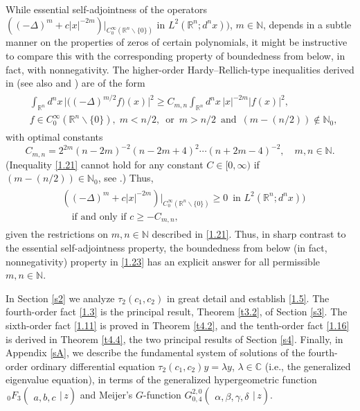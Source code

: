 \documentclass[reqno,11pt,centertags]{amsart}
\newcommand{\bbN}{{\mathbb{N}}}
\newcommand{\bbR}{{\mathbb{R}}}
\newcommand{\bbC}{{\mathbb{C}}}
\newcommand{\<}{\langle}
\renewcommand{\>}{\rangle}
\newcommand{\lb}{\label}
\numberwithin{equation}{section}
\theoremstyle{definition}
\begin{document}
While essential self-adjointness of the operators $\left((-\Delta)^m +c|x|^{-2m}\right)\big|_{C_0^{\infty}(\bbR^n \backslash \{0\})}$ in $L^2(\bbR^n; d^nx))$, $m \in \bbN$, depends in a subtle manner on the properties of zeros of certain polynomials, it might be instructive to compare this with the corresponding property of boundedness from below, in fact, with nonnegativity. The higher-order Hardy--Rellich-type inequalities derived in \cite{Ya99} (see also \cite[p.~39--40]{BEL15} and \cite{He77}) are of the form 
\begin{align}
\begin{split} 
& \int_{\bbR^n} d^n x \, \big|\big((-\Delta)^{m/2} f\big)(x)\big|^2 \geq C_{m,n} \int_{\bbR^n} d^n x \, |x|^{-2m} |f(x)|^2,     \lb{1.21} \\
& f \in C_0^{\infty}(\bbR^n\backslash\{0\}), \; m < n/2, \, \text{ or } \, m > n/2 \, \text{ and } \, 
(m - (n/2)) \notin \bbN_0, 
\end{split}
\end{align}
with optimal constants
\begin{equation}
C_{m,n} = 2^{2m} (n-2m)^{-2} (n-2m +4)^2 \cdots (n+2m-4)^{-2}, \quad m, n \in \bbN.   \lb{1.22} 
\end{equation} 
(Inequality \eqref{1.21} cannot hold for any constant $C \in [0,\infty)$ if $(m - (n/2)) \in \bbN_0$, see \cite{Ya99}.) Thus, 
\begin{align}
\begin{split} 
& \left((-\Delta)^m +c|x|^{-2m}\right)\big|_{C_0^{\infty}(\bbR^n \backslash \{0\})} \geq 0 \, \text{ in $L^2(\bbR^n; d^nx))$}    \lb{1.23} \\
& \quad \text{if and only if $c \geq - C_{m,n}$,}
\end{split} 
\end{align}
given the restrictions on $m,n \in \bbN$ described in \eqref{1.21}. Thus, in sharp contrast to the essential self-adjointness property, the boundedness from below (in fact, nonnegativity) property in \eqref{1.23} has an explicit answer for all permissible $m,n \in \bbN$.

In Section \ref{s2} we analyze $\tau_2(c_1,c_2)$ in great detail and establish \eqref{1.5}. The fourth-order fact \eqref{1.3} is the principal result, Theorem \ref{t3.2}, of Section \ref{s3}. The sixth-order fact \eqref{1.11} 
is proved in Theorem \ref{t4.2}, and the tenth-order fact \eqref{1.16} is derived in Theorem \ref{t4.4}, the two principal results of Section \ref{s4}. Finally, in Appendix \ref{sA}, we describe the fundamental system of solutions  of the fourth-order ordinary differential equation $\tau_2(c_1,c_2) y = \lambda y$, $\lambda \in \bbC$ (i.e., the generalized eigenvalue equation), in terms of the generalized hypergeometric function $\,_{0} F_3\left(\!\begin{array}{c}\\ { a, b, c} \end{array} \bigg\vert\,  z \right)$ and Meijer's $G$-function $G_{0,4}^{2,0}\left(\!\begin{array}{c}\\
{\alpha, \beta,\gamma,\delta}\end{array} \bigg\vert\, z \right)$. 
 
\end{document}
